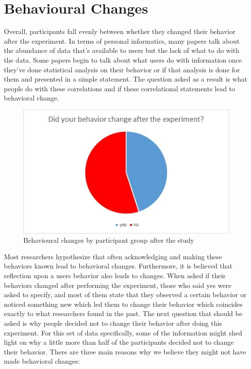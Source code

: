 \section{Behavioural Changes}
Overall, participants fall evenly between whether they changed their behavior after the experiment. In terms of personal informatics, many papers talk about the abundance of data that’s available to users but the lack of what to do with the data. Some papers begin to talk about what users do with information once they’ve done statistical analysis on their behavior or if that analysis is done for them and presented in a simple statement. The question asked as a result is what people do with these correlations and if these correlational statements lead to behavioral change. 

\begin{figure}[!t]\centering
\includegraphics[width=1.0\columnwidth]{images/behavior_change.jpg}
\caption{\footnotesize Behavioural changes by participant group after the study \label{fig:behaviorchange} 
}
\end{figure}

    Most researchers hypothesize that often acknowledging and making these behaviors known lead to behavioral changes. Furthermore, it is believed that reflection upon a user\textquotesingle s behavior also leads to changes. When asked if their behaviors changed after performing the experiment, those who said yes were asked to specify, and most of them state that they observed a certain behavior or noticed something new which led them to change their behavior which coincides exactly to what researchers found in the past. 
    The next question that should be asked is why people decided not to change their behavior after doing this experiment. For this set of data specifically, some of the information might shed light on why a little more than half of the participants decided not to change their behavior. There are three main reasons why we believe they might not have made behavioral changes:
